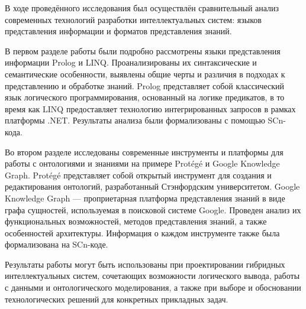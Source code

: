 
В ходе проведённого исследования был осуществлён сравнительный анализ современных технологий разработки интеллектуальных систем: языков представления информации и форматов представления знаний.

В первом разделе работы были подробно рассмотрены языки представления информации Prolog и LINQ. Проанализированы их синтаксические и семантические особенности, выявлены общие черты и различия в подходах к представлению и обработке знаний. Prolog представляет собой классический язык логического программирования, основанный на логике предикатов, в то время как LINQ предоставляет технологию интегрированных запросов в рамках платформы .NET. Результаты анализа были формализованы с помощью SCn-кода.

Во втором разделе исследованы современные инструменты и платформы для работы с онтологиями и знаниями на примере Protégé и Google Knowledge Graph. Protégé представляет собой открытый инструмент для создания и редактирования онтологий, разработанный Стэнфордским университетом. Google Knowledge Graph --- проприетарная платформа представления знаний в виде графа сущностей, используемая в поисковой системе Google. Проведен анализ их функциональных возможностей, методов представления знаний, а также особенностей архитектуры. Информация о каждом инструменте также была формализована на SCn-коде.

Результаты работы могут быть использованы при проектировании гибридных интеллектуальных систем, сочетающих возможности логического вывода, работы с данными и онтологического моделирования, а также при выборе и обосновании технологических решений для конкретных прикладных задач.
